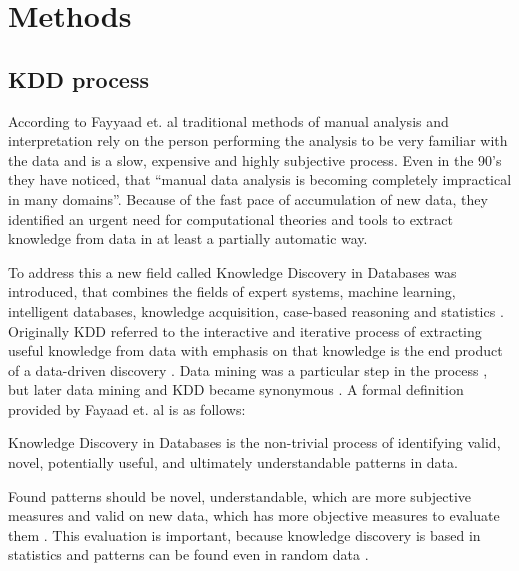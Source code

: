 \documentclass[utf8,english]{gradu3}
\begin{document}


\chapter{Methods}


\section{KDD process}

According to Fayyaad et. al \parencite*{fayyadDataMiningKnowledge1996} traditional methods of manual analysis and interpretation rely on the person performing the analysis to be very familiar with the data and is a slow, expensive and highly subjective process. Even in the 90's they have noticed, that \enquote{manual data analysis is becoming completely impractical in many domains}. Because of the fast pace of accumulation of new data, they identified an urgent need for computational theories and tools to extract knowledge from data in at least a partially automatic way.

To address this a new field called Knowledge Discovery in Databases was introduced, that combines the fields of expert systems, machine learning, intelligent databases, knowledge acquisition, case-based reasoning and statistics \parencite{piatetsky-shapiroKnowledgeDiscoveryReal1990}. Originally KDD referred to the interactive and iterative process of extracting useful knowledge from data with emphasis on that knowledge is the end product of a data-driven discovery \parencite{fayyadKnowledgeDiscoveryData1996}. Data mining was a particular step in the process \parencite{fayyadKnowledgeDiscoveryData1996}, but later data mining and KDD became synonymous \parencite{piatetsky-shapiroKnowledgeDiscoveryDatabases2000}. A formal definition provided by Fayaad et. al \parencite*{fayyadKnowledgeDiscoveryData1996} is as follows:
\begin{displayquote}
Knowledge Discovery in Databases is the non-trivial process of identifying valid, novel, potentially useful, and ultimately understandable patterns in data.
\end{displayquote}



Found patterns should be novel, understandable, which are more subjective measures and valid on new data, which has more objective measures to evaluate them \parencite{fayyadKnowledgeDiscoveryData1996}. This evaluation is important, because knowledge discovery is based in statistics and patterns can be found even in random data \parencite{fayyadDataMiningKnowledge1996}.
\end{document}
